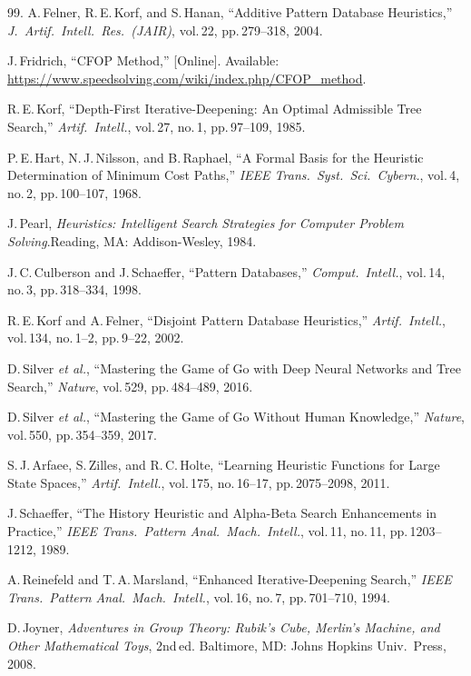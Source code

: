 \documentclass[graybox]{svmult}
\begin{document}
\begin{thebibliography}{99.}
A.\,Felner, R.\,E.\,Korf, and S.\,Hanan,
``Additive Pattern Database Heuristics,'' \textit{J.\ Artif.\
Intell.\ Res.\ (JAIR)}, vol.\,22, pp.\,279--318, 2004.

J.\,Fridrich, ``CFOP Method,'' [Online]. Available:
\url{https://www.speedsolving.com/wiki/index.php/CFOP_method}.

R.\,E.\,Korf, ``Depth-First Iterative-Deepening: An Optimal
Admissible Tree Search,'' \textit{Artif.\ Intell.}, vol.\,27,
no.\,1, pp.\,97--109, 1985.

P.\,E.\,Hart, N.\,J.\,Nilsson, and B.\,Raphael, ``A Formal Basis
for the Heuristic Determination of Minimum Cost Paths,''
\textit{IEEE Trans.\ Syst.\ Sci.\ Cybern.}, vol.\,4, no.\,2,
pp.\,100--107, 1968.

J.\,Pearl, \textit{Heuristics: Intelligent Search Strategies for
Computer Problem Solving}.\quad Reading, MA: Addison-Wesley, 1984.

J.\,C.\,Culberson and J.\,Schaeffer, ``Pattern Databases,''
\textit{Comput.\ Intell.}, vol.\,14, no.\,3, pp.\,318--334, 1998.

R.\,E.\,Korf and A.\,Felner, ``Disjoint Pattern Database
Heuristics,'' \textit{Artif.\ Intell.}, vol.\,134, no.\,1--2,
pp.\,9--22, 2002.

D.\,Silver \textit{et al.}, ``Mastering the Game of {G}o with Deep
Neural Networks and Tree Search,'' \textit{Nature}, vol.\,529,
pp.\,484--489, 2016.

D.\,Silver \textit{et al.}, ``Mastering the Game of {G}o Without
Human Knowledge,'' \textit{Nature}, vol.\,550, pp.\,354--359, 2017.

S.\,J.\,Arfaee, S.\,Zilles, and R.\,C.\,Holte, ``Learning
Heuristic Functions for Large State Spaces,'' \textit{Artif.\
Intell.}, vol.\,175, no.\,16--17, pp.\,2075--2098, 2011.

J.\,Schaeffer, ``The History Heuristic and Alpha-Beta Search
Enhancements in Practice,'' \textit{IEEE Trans.\ Pattern Anal.\
Mach.\ Intell.}, vol.\,11, no.\,11, pp.\,1203--1212, 1989.

\bibitem{reinefeld1994}
A.\,Reinefeld and T.\,A.\,Marsland, ``Enhanced Iterative-Deepening
Search,'' \textit{IEEE Trans.\ Pattern Anal.\ Mach.\ Intell.},
vol.\,16, no.\,7, pp.\,701--710, 1994.

\bibitem{joyner2008}
D.\,Joyner, \textit{Adventures in Group Theory: {R}ubik's {C}ube,
{M}erlin's Machine, and Other Mathematical Toys}, 2nd\,ed.\quad
Baltimore, MD: Johns Hopkins Univ.\ Press, 2008.


\end{thebibliography}
\end{document}
